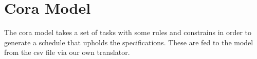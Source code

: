 \section{Cora Model} \label{sec:cora}
The \gls{cora} model takes a set of tasks with some rules and constrains in order to generate a schedule that upholds the specifications. These are fed to the model from the csv file via our own translator.
